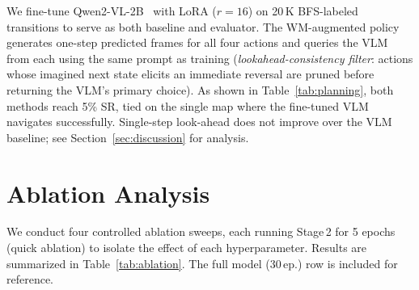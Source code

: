 \documentclass[11pt]{article}
\begin{document}
We fine-tune Qwen2-VL-2B~\cite{wang2024qwen2vl} with LoRA ($r{=}16$) on 20\,K
BFS-labeled transitions to serve as both baseline and evaluator.
The WM-augmented policy generates one-step predicted frames for all four actions
and queries the VLM from each using the same prompt as training
(\emph{lookahead-consistency filter}: actions whose imagined next state elicits
an immediate reversal are pruned before returning the VLM's primary choice).
As shown in Table~\ref{tab:planning}, both methods reach 5\% SR,
tied on the single map where the fine-tuned VLM navigates successfully.
Single-step look-ahead does not improve over the VLM baseline; see Section~\ref{sec:discussion} for analysis.

\section{Ablation Analysis}

We conduct four controlled ablation sweeps, each running Stage\,2
for 5 epochs (quick ablation) to isolate the effect of each hyperparameter.
Results are summarized in Table~\ref{tab:ablation}.
The full model (30\,ep.) row is included for reference.
\end{document}
